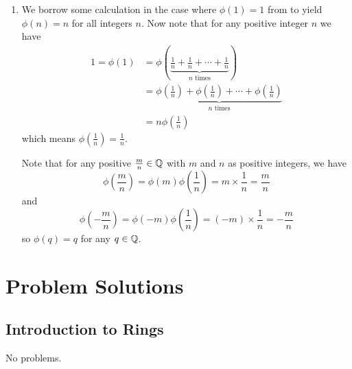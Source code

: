 \begin{enumerate}
    \item We borrow some calculation in the case where $\phi(1) = 1$ from  to yield $\phi(n) = n$ for all integers $n$. Now note that for any positive integer $n$ we have
    \begin{align*}
        1 = \phi(1) &= \phi\left(\underbrace{\frac1n + \frac1n + \cdots + \frac1n}_{n \text{ times}}\right)\\
        &= \underbrace{\phi\left(\frac1n\right) + \phi\left(\frac1n\right) + \cdots + \phi\left(\frac1n\right)}_{n \text{ times}}\\
        &= n\phi\left(\frac1n\right)
    \end{align*}
    which means $\phi\left(\frac1n\right) = \frac1n$.

    Note that for any positive $\frac mn \in \mathbb{Q}$ with $m$ and $n$ as positive integers, we have
    \[
        \phi\left(\frac mn\right) = \phi(m)\phi\left(\frac1n\right) = m \times \frac1n = \frac mn
    \]
    and
    \[
        \phi\left(-\frac mn\right) = \phi(-m)\phi\left(\frac1n\right) = (-m) \times \frac1n = -\frac mn
    \]
    so $\phi(q) = q$ for any $q \in \mathbb{Q}$.
\end{enumerate}

\chapter{Problem Solutions}
\section{Introduction to Rings}
No problems.

